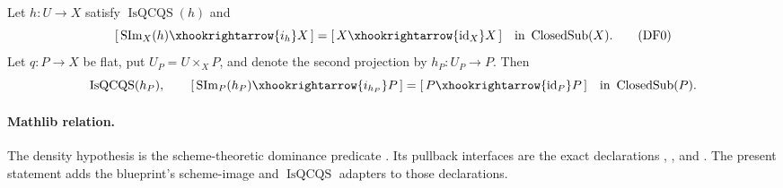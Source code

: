 \begin{lemma}
  \label{lemma:nagata-dense-flat-pullback}

  Let $h\colon U\to X$ satisfy $\operatorname{IsQCQS}(h)$ and
  \[
    [\,\operatorname{SIm}_X(h)\xhookrightarrow{i_h}X\,]
      =[\,X\xhookrightarrow{\operatorname{id}_X}X\,]
      \quad\text{in }\operatorname{ClosedSub}(X).                \tag{DF0}
  \]
  Let $q\colon P\to X$ be flat,
  put $U_P=U\times_XP$, and denote the second projection by
  $h_P\colon U_P\to P$.  Then
  \[
    \operatorname{IsQCQS}(h_P),
    \qquad
    [\,\operatorname{SIm}_P(h_P)\xhookrightarrow{i_{h_P}}P\,]
      =[\,P\xhookrightarrow{\operatorname{id}_P}P\,]
      \quad\text{in }\operatorname{ClosedSub}(P).
  \]

  \paragraph{Mathlib relation.}
  The density hypothesis is the scheme-theoretic dominance predicate
  \texttt{}.
  Its pullback interfaces are the exact declarations
  \texttt{},
  \texttt{}, and
  \texttt{}.  The
  present statement adds the blueprint's scheme-image and
  $\operatorname{IsQCQS}$ adapters to those declarations.
\end{lemma}

